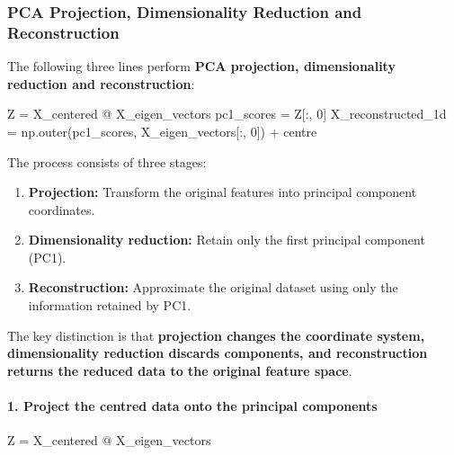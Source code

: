 \documentclass[11pt]{article}
\providecommand{\tightlist}{%
      \setlength{\itemsep}{0pt}\setlength{\parskip}{0pt}}
\newenvironment{Shaded}{}{}
\newcommand{\DecValTok}[1]{\textcolor[rgb]{0.25,0.63,0.44}{{#1}}}
\newcommand{\NormalTok}[1]{{#1}}
\newcommand{\OperatorTok}[1]{\textcolor[rgb]{0.40,0.40,0.40}{{#1}}}
\begin{document}
    \subsubsection{PCA Projection, Dimensionality Reduction and
Reconstruction}\label{pca-projection-dimensionality-reduction-and-reconstruction}

The following three lines perform \textbf{PCA projection, dimensionality
reduction and reconstruction}:

\begin{Shaded}
\begin{Highlighting}[]
\NormalTok{Z }\OperatorTok{=}\NormalTok{ X\_centered }\OperatorTok{@}\NormalTok{ X\_eigen\_vectors}
\NormalTok{pc1\_scores }\OperatorTok{=}\NormalTok{ Z[:, }\DecValTok{0}\NormalTok{]}
\NormalTok{X\_reconstructed\_1d }\OperatorTok{=}\NormalTok{ np.outer(pc1\_scores, X\_eigen\_vectors[:, }\DecValTok{0}\NormalTok{]) }\OperatorTok{+}\NormalTok{ centre}
\end{Highlighting}
\end{Shaded}

The process consists of three stages:

\begin{enumerate}
\def\labelenumi{\arabic{enumi}.}
\tightlist
\item
  \textbf{Projection:} Transform the original features into principal
  component coordinates.
\item
  \textbf{Dimensionality reduction:} Retain only the first principal
  component (PC1).
\item
  \textbf{Reconstruction:} Approximate the original dataset using only
  the information retained by PC1.
\end{enumerate}

The key distinction is that \textbf{projection changes the coordinate
system, dimensionality reduction discards components, and reconstruction
returns the reduced data to the original feature space}.

\paragraph{1. Project the centred data onto the principal
components}\label{project-the-centred-data-onto-the-principal-components}

\begin{Shaded}
\begin{Highlighting}[]
\NormalTok{Z }\OperatorTok{=}\NormalTok{ X\_centered }\OperatorTok{@}\NormalTok{ X\_eigen\_vectors}
\end{Highlighting}
\end{Shaded}
\end{document}

